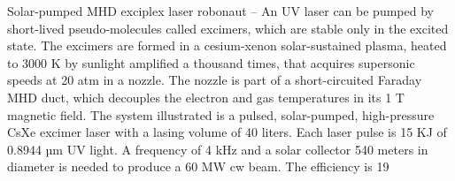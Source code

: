 \documentclass[a4paper]{book}
\begin{document}
Solar-pumped MHD exciplex laser robonaut – An UV laser can be pumped by short-lived pseudo-molecules called excimers, which are stable only in the excited state. The excimers are formed in a cesium-xenon solar-sustained plasma, heated to 3000 K by sunlight amplified a thousand times, that acquires supersonic speeds at 20 atm in a nozzle.  The nozzle is part of a short-circuited Faraday MHD duct, which decouples the electron and gas temperatures in its 1 T magnetic field. The system illustrated is a pulsed, solar-pumped, high-pressure CsXe excimer laser with a lasing volume of 40 liters. Each laser pulse is 15 KJ of 0.8944 µm UV light.  A frequency of 4 kHz and a solar collector 540 meters in diameter is needed to produce a 60 MW cw beam. The efficiency is 19%
 
\end{document}
